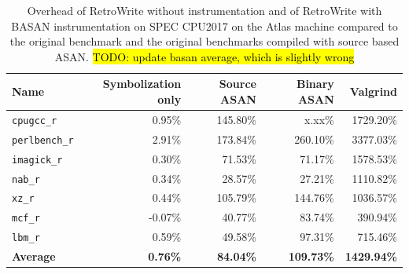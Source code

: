 \documentclass[a4paper,11pt,oneside]{report}
\newcommand{\sysname}{RetroWrite\xspace}
\DeclareRobustCommand{\todo}[1]{{\sethlcolor{cyan}\hl{TODO: #1}}}
\begin{document}
\begin{table}
\centering
\begin{tabular}{lrrrr}
\toprule
	\textbf{Name} \hspace{4em} &\textbf{Symbolization only} & \textbf{Source ASAN} & \textbf{Binary ASAN} & \textbf{Valgrind} \\
\toprule

	\texttt{cpugcc\_r   } & 0.95\% &145.80\% & x.xx\% & 1729.20\% \\
	\texttt{perlbench\_r} & 2.91\% &173.84\% &260.10\% &3377.03\% \\
	\texttt{imagick\_r}   & 0.30\% & 71.53\% & 71.17\% &1578.53\% \\
	\texttt{nab\_r      } & 0.34\% & 28.57\% & 27.21\% &1110.82\% \\
	\texttt{xz\_r   }     & 0.44\% &105.79\% &144.76\% &1036.57\% \\
	\texttt{mcf\_r      } &-0.07\% & 40.77\% & 83.74\% & 390.94\% \\
	\texttt{lbm\_r      } & 0.59\% & 49.58\% & 97.31\% & 715.46\% \\
	\midrule
	\textbf{Average} & \textbf{0.76\%} & \textbf{84.04\%} & \textbf{109.73\%} & \textbf{1429.94\%} \\
\bottomrule
\end{tabular}
\caption{Overhead of \sysname without instrumentation and of \sysname with
BASAN instrumentation on SPEC CPU2017 on the Atlas machine compared to the original benchmark
and the original benchmarks compiled with source based ASAN.
\todo{update basan average, which is slightly wrong} } 
\label{labellatabella}
\end{table}



\end{document}
